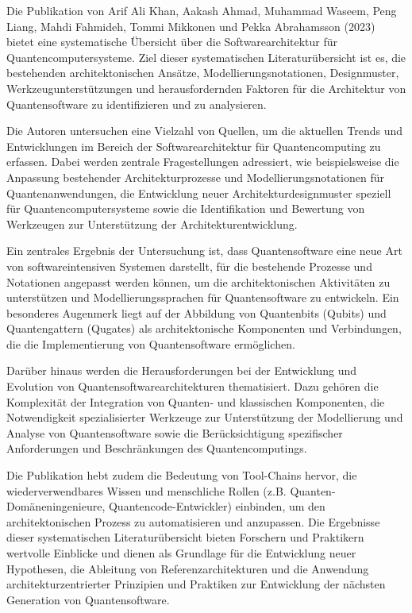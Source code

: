 Die Publikation von Arif Ali Khan, Aakash Ahmad, Muhammad Waseem, Peng Liang, Mahdi Fahmideh, Tommi Mikkonen und Pekka 
Abrahamsson (2023) bietet eine systematische Übersicht über die Softwarearchitektur für Quantencomputersysteme. Ziel 
dieser systematischen Literaturübersicht ist es, die bestehenden architektonischen Ansätze, Modellierungsnotationen, 
Designmuster, Werkzeugunterstützungen und herausfordernden Faktoren für die Architektur von Quantensoftware zu 
identifizieren und zu analysieren.

Die Autoren untersuchen eine Vielzahl von Quellen, um die aktuellen Trends und Entwicklungen im Bereich der Softwarearchitektur 
für Quantencomputing zu erfassen. Dabei werden zentrale Fragestellungen adressiert, wie beispielsweise die Anpassung bestehender 
Architekturprozesse und Modellierungsnotationen für Quantenanwendungen, die Entwicklung neuer Architekturdesignmuster speziell 
für Quantencomputersysteme sowie die Identifikation und Bewertung von Werkzeugen zur Unterstützung der Architekturentwicklung.

Ein zentrales Ergebnis der Untersuchung ist, dass Quantensoftware eine neue Art von softwareintensiven Systemen darstellt, für 
die bestehende Prozesse und Notationen angepasst werden können, um die architektonischen Aktivitäten zu unterstützen und 
Modellierungssprachen für Quantensoftware zu entwickeln. Ein besonderes Augenmerk liegt auf der Abbildung von 
Quantenbits (Qubits) und Quantengattern (Qugates) als architektonische Komponenten und Verbindungen, die die 
Implementierung von Quantensoftware ermöglichen.

Darüber hinaus werden die Herausforderungen bei der Entwicklung und Evolution von Quantensoftwarearchitekturen thematisiert. 
Dazu gehören die Komplexität der Integration von Quanten- und klassischen Komponenten, die Notwendigkeit spezialisierter 
Werkzeuge zur Unterstützung der Modellierung und Analyse von Quantensoftware sowie die Berücksichtigung spezifischer 
Anforderungen und Beschränkungen des Quantencomputings.

Die Publikation hebt zudem die Bedeutung von Tool-Chains hervor, die wiederverwendbares Wissen und menschliche 
Rollen (z.B. Quanten-Domäneningenieure, Quantencode-Entwickler) einbinden, um den architektonischen Prozess zu 
automatisieren und anzupassen. Die Ergebnisse dieser systematischen Literaturübersicht bieten Forschern und Praktikern 
wertvolle Einblicke und dienen als Grundlage für die Entwicklung neuer Hypothesen, die Ableitung von 
Referenzarchitekturen und die Anwendung architekturzentrierter Prinzipien und Praktiken zur Entwicklung der nächsten Generation von Quantensoftware.

